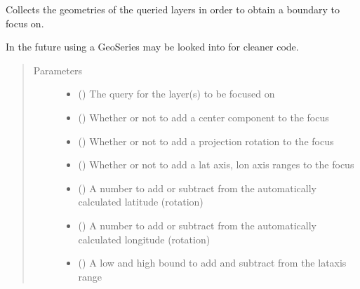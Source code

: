 \documentclass[letterpaper,10pt,english]{sphinxmanual}
\begin{document}
\begin{fulllineitems}
\begin{fulllineitems}
\sphinxAtStartPar
Collects the geometries of the queried layers in order to
obtain a boundary to focus on.

\sphinxAtStartPar
In the future using a GeoSeries may be looked into for cleaner code.
\begin{quote}\begin{description}
\item[{Parameters}] \leavevmode\begin{itemize}
\item {} 
\sphinxAtStartPar
{} () \textendash{} The query for the layer(s) to be focused on

\item {} 
\sphinxAtStartPar
{} () \textendash{} Whether or not to add a center component to the focus

\item {} 
\sphinxAtStartPar
{} () \textendash{} Whether or not to add a projection rotation to the focus

\item {} 
\sphinxAtStartPar
{} () \textendash{} Whether or not to add a lat axis, lon axis ranges to the focus

\item {} 
\sphinxAtStartPar
{} () \textendash{} A number to add or subtract from the automatically calculated latitude (rotation)

\item {} 
\sphinxAtStartPar
{} () \textendash{} A number to add or subtract from the automatically calculated longitude (rotation)

\item {} 
\sphinxAtStartPar
{} (\sphinxstyleliteralemphasis{\sphinxupquote{{[}}}\sphinxstyleliteralemphasis{\sphinxupquote{, }}\sphinxstyleliteralemphasis{\sphinxupquote{{]}}}) \textendash{} A low and high bound to add and subtract from the lataxis range


\end{itemize}
\end{description}
\end{quote}
\end{fulllineitems}
\end{fulllineitems}
\end{document}
